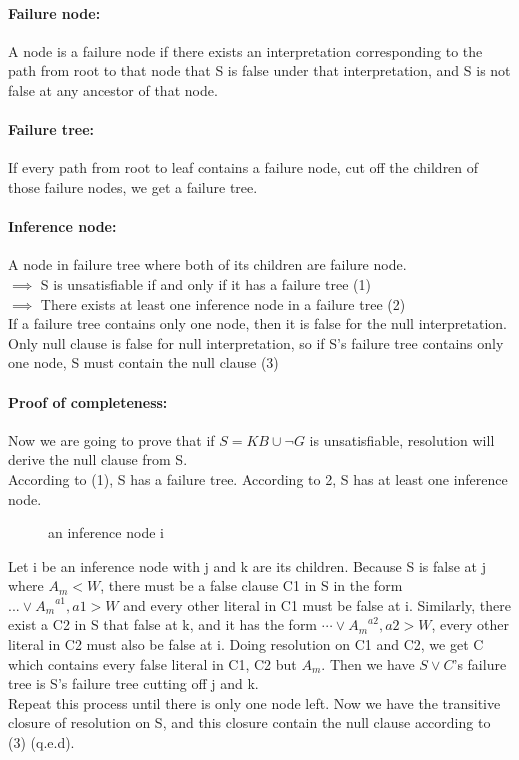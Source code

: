 \documentclass[part1.tex]{subfiles}
\begin{document}
\paragraph{Failure node: } A node is a failure node if there exists an interpretation corresponding to
the path from root to that node that S is false under that interpretation, and S is not false at 
any ancestor of that node.\\
\paragraph{Failure tree: } If every path from root to leaf contains a failure node, cut off the children
of those failure nodes, we get a failure tree.\\
\paragraph{Inference node: } A node in failure tree where both of its children are failure node.\\
\(\implies\) S is unsatisfiable if and only if it has a failure tree (1)\\
\(\implies\) There exists at least one inference node in a failure tree (2)\\
If a failure tree contains only one node, then it is false for the null interpretation.
Only null clause is false for null interpretation, so if S's failure tree contains only one node, S
must contain the null clause (3)\\
%
\paragraph{Proof of completeness: } Now we are going to prove that if \(S = KB \cup \neg G\) is 
unsatisfiable, resolution will derive the null clause from S. \\
According to (1), S has a failure tree. According to 2, S has at least one inference node.\\
\begin{figure}[H]
\caption{an inference node i}
\end{figure}
Let i be an inference node with j and k are its children. Because S is false at j where \(A_m < W\),
there must be a false clause C1 in S in the form \(...\vee {A_{m}}^{a1}, a1 > W\) and every other 
literal in C1 must be false at i. Similarly, there exist a C2 in S that false at k, and it has the form 
\(\cdots\vee {A_{m}}^{a2}, a2 > W\), every other literal in C2 must also be false at i.
Doing resolution on C1 and C2, we get C which contains every false literal in C1, C2 but \(A_{m}\).
Then we have \(S \vee C\)'s failure tree is S's failure tree cutting off j and k.\\
Repeat this process until there is only one node left. Now we have the transitive closure of resolution
on S, and this closure contain the null clause according to (3) (q.e.d).
\\
\end{document}

